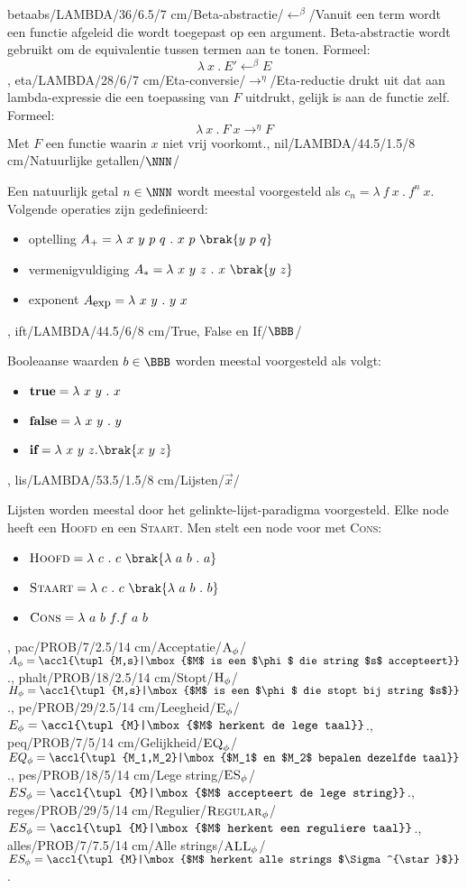 betaabs/LAMBDA/36/6.5/7 cm/Beta-abstractie/$\leftarrow^{\beta}$/{Vanuit een term wordt een functie afgeleid die wordt toegepast op een argument. Beta-abstractie wordt gebruikt om de equivalentie tussen termen aan te tonen. Formeel:\[\lambda\ x\ .\ E'\leftarrow^{\beta}E\]},
eta/LAMBDA/28/6/7 cm/Eta-conversie/$\rightarrow^{\eta}$/{Eta-reductie drukt uit dat aan lambda-expressie die een toepassing van $F$ uitdrukt, gelijk is aan de functie zelf. Formeel:\[\lambda\ x\ .\ F\ x\rightarrow^{\eta}F\]Met $F$ een functie waarin $x$ niet vrij voorkomt.},
nil/LAMBDA/44.5/1.5/8 cm/Natuurlijke getallen/$\NNN$/{Een natuurlijk getal $n\in\NNN$ wordt meestal voorgesteld als $c_n=\lambda\ f\ x\ .\ f^n\ x$. Volgende operaties zijn gedefinieerd:\begin{itemize}\item optelling $A_{+}=\lambda\ x\ y\ p\ q\ .\ x\ p\ \brak{y\ p\ q}$\item vermenigvuldiging $A_{*}=\lambda\ x\ y\ z\ .\ x\ \brak{y\ z}$\item exponent $A_{\mbox{\small exp}}=\lambda\ x\ y\ .\ y\ x$\end{itemize}},
ift/LAMBDA/44.5/6/8 cm/{True, False en If}/$\BBB$/{Booleaanse waarden $b\in\BBB$ worden meestal voorgesteld als volgt:\begin{itemize}\item $\mbox{\bf true}=\lambda\ x\ y\ .\ x$\item $\mbox{\bf false}=\lambda\ x\ y\ .\ y$\item $\mbox{\bf if}=\lambda\ x\ y\ z.\brak{x\ y\ z}$\end{itemize}},
lis/LAMBDA/53.5/1.5/8 cm/{Lijsten}/$\vec{x}$/{Lijsten worden meestal door het gelinkte-lijst-paradigma voorgesteld. Elke node heeft een \textsc{Hoofd} en een \textsc{Staart}. Men stelt een node voor met \textsc{Cons}:\begin{itemize}\item $\mbox{\sc Hoofd}=\lambda\ c\ .\ c\ \brak{\lambda\ a\ b\ .\ a}$\item $\mbox{\sc Staart}=\lambda\ c\ .\ c\ \brak{\lambda\ a\ b\ .\ b}$\item $\mbox{\sc Cons}=\lambda\ a\ b\ f.f\ a\ b$\end{itemize}},
pac/PROB/7/2.5/14 cm/Acceptatie/$\mbox{\textsc{A}}_{\phi}$/{$A_{\phi}=\accl{\tupl{M,s}|\mbox{$M$ is een $\phi$ die string $s$ accepteert}}$.},
phalt/PROB/18/2.5/14 cm/Stopt/$\mbox{\textsc{H}}_{\phi}$/{$H_{\phi}=\accl{\tupl{M,s}|\mbox{$M$ is een $\phi$ die stopt bij string $s$}}$.},
pe/PROB/29/2.5/14 cm/Leegheid/$\mbox{\textsc{E}}_{\phi}$/{$E_{\phi}=\accl{\tupl{M}|\mbox{$M$ herkent de lege taal}}$.},
peq/PROB/7/5/14 cm/Gelijkheid/$\mbox{\textsc{EQ}}_{\phi}$/{$EQ_{\phi}=\accl{\tupl{M_1,M_2}|\mbox{$M_1$ en $M_2$ bepalen dezelfde taal}}$.},
pes/PROB/18/5/14 cm/Lege string/$\mbox{\textsc{ES}}_{\phi}$/{$ES_{\phi}=\accl{\tupl{M}|\mbox{$M$ accepteert de lege string}}$.},
reges/PROB/29/5/14 cm/Regulier/$\mbox{\textsc{Regular}}_{\phi}$/{$ES_{\phi}=\accl{\tupl{M}|\mbox{$M$ herkent een reguliere taal}}$.},
alles/PROB/7/7.5/14 cm/Alle strings/$\mbox{\textsc{ALL}}_{\phi}$/{$ES_{\phi}=\accl{\tupl{M}|\mbox{$M$ herkent alle strings $\Sigma^{\star}$}}$.}